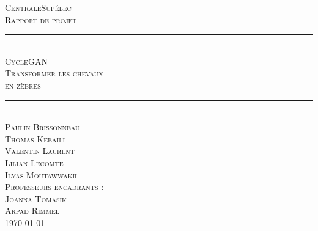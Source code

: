 \documentclass[a4paper]{report}
\newcommand{\HRule}{\rule{\linewidth}{0.5mm}}
\begin{document}
\begin{titlepage}
  \begin{sffamily}
  \begin{center}

    \textsc{\Large CentraleSupélec}\\[2cm]
    
    \textsc{\huge Rapport de projet}\\[1cm]

	\HRule \\[0.55cm]
    \textsc{\Huge CycleGAN \\[0.2cm] \huge Transformer les chevaux\\en zèbres}\\[0.6cm]
	\HRule \\[3cm]
    
 
  
    \textsc{\large Paulin Brissonneau\\
    	Thomas Kebaili\\
    	Valentin Laurent\\
    	Lilian Lecomte\\
    	Ilyas Moutawwakil}\\[1cm]
        
    \textsc{\large Professeurs encadrants :\\
        Joanna Tomasik\\
        Arpad Rimmel}\\


    \vfill
	{\textsc{\large\today}}
  \end{center}
  \end{sffamily}
\end{titlepage}



\tableofcontents










\newpage
\end{document}
